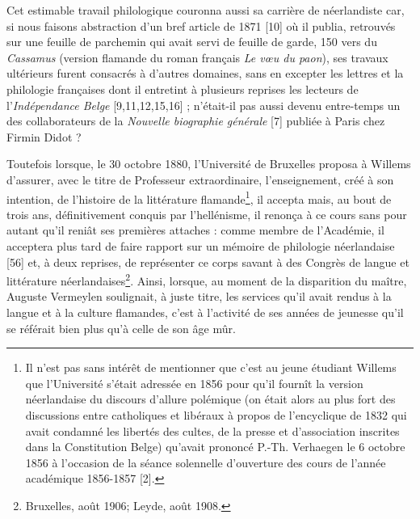 \documentclass{book}%
\newcommand{\italique}[1]{\textit{#1}}%
\newcommand{\note}[1]{\footnote{#1}}
\begin{document}
Cet estimable travail philologique couronna aussi sa carrière de néerlandiste car, si nous faisons abstraction d'un bref article de 1871 [10] où il publia, retrouvés sur une feuille de parchemin qui avait servi de feuille de garde, 150 vers du \italique{Cassamus} (version flamande du roman français \italique{Le vœu du paon}), ses travaux ultérieurs furent consacrés à d'autres domaines, sans en excepter les lettres et la philologie françaises dont il entretint à plusieurs reprises les lecteurs de l'\italique{Indépendance Belge} [9,11,12,15,16] ; n'était-il pas aussi devenu entre-temps un des collaborateurs de la \italique{Nouvelle biographie générale} [7] publiée à Paris chez Firmin Didot ? 

Toutefois lorsque, le 30 octobre 1880, l'Université de Bruxelles proposa à Willems d'assurer, avec le titre de Professeur extraordinaire, l'enseignement, créé à son intention, de l'histoire de la littérature flamande\note{Il n'est pas sans intérêt de mentionner que c'est au jeune étudiant Willems que l'Université s'était adressée en 1856 pour qu'il fournît la version néerlandaise du discours d'allure polémique (on était alors au plus fort des discussions entre catholiques et libéraux à propos de l'encyclique de 1832 qui avait condamné les libertés des cultes, de la presse et d'association inscrites dans la Constitution Belge) qu'avait prononcé P.-Th. Verhaegen le 6 octobre 1856 à l'occasion de la séance solennelle d'ouverture des cours de l'année académique 1856-1857 [2].}, il accepta mais, au bout de trois ans, définitivement conquis par l'hellénisme, il renonça à ce cours sans pour autant qu'il reniât ses premières attaches : comme membre de l'Académie, il acceptera plus tard de faire rapport sur un mémoire de philologie néerlandaise [56] et, à deux reprises, de représenter ce corps savant à des Congrès de langue et littérature néerlandaises\note{Bruxelles, août 1906; Leyde, août 1908.}.
Ainsi, lorsque, au moment de la disparition du maître, Auguste Vermeylen soulignait, à juste titre, les services qu'il avait rendus à la langue et à la culture flamandes, c'est à l'activité de ses années de jeunesse qu'il se référait bien plus qu'à celle de son âge mûr. \\
\end{document}
